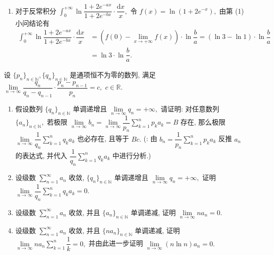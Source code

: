 \begin{solution}
\begin{enumerate}
\item 对于反常积分 $\displaystyle \int_0^{+\infty} \ln \dfrac{1+2e^{-ax}}{1+2e^{-bx}} \cdot \dfrac{\mathrm{d}x}{x},$ 令 $f(x) = \ln(1 + 2e^{-x}),$ 由第 (1) 小问结论有
\begin{align*}
\int_0^{+\infty} \ln \dfrac{1+2e^{-ax}}{1+2e^{-bx}} \cdot \dfrac{\mathrm{d}x}{x} & = (f(0) - \lim_{x \to +\infty} f(x)) \cdot \ln\dfrac{b}{a} = (\ln 3 - \ln 1) \cdot \ln\dfrac{b}{a} \\
& = \ln 3 \cdot \ln\dfrac{b}{a}.
\end{align*}
\end{enumerate}
\end{solution}


\begin{question}[points = 12]
设 $\{ p_n \}_{n \in \mathbb{N}}, \{ q_n \}_{n \in \mathbb{N}}$ 是通项恒不为零的数列, 满足 $\lim\limits_{n\to\infty} \dfrac{q_n}{q_n - q_{n-1}} \cdot \dfrac{p_n - p_{n-1}}{p_n} = c,$ $c \in \mathbb{R}.$
\begin{enumerate}
\item 假设数列 $\{ q_n \}_{n \in \mathbb{N}}$ 单调递增且 $\lim\limits_{n \to \infty} q_n = +\infty,$ 请证明: 对任意数列 $\{ a_n \}_{n \in \mathbb{N}},$ 若极限 $\lim\limits_{n \to \infty} b_n = \lim\limits_{n \to \infty} \dfrac{1}{p_n} \sum\limits_{k=1}^n p_ka_k = B$ 存在, 那么极限 $\lim\limits_{n \to \infty} \dfrac{1}{q_n} \sum\limits_{k=1}^n q_ka_k$ 也必存在, 且等于 $Bc.$ (: 由 $\displaystyle b_n = \dfrac{1}{p_n} \sum\limits_{k=1}^n p_ka_k$ 反推 $a_n$ 的表达式, 并代入 $\displaystyle \dfrac{1}{q_n} \sum\limits_{k=1}^n q_ka_k$ 中进行分析.)
\item 设级数 $\sum\limits_{n=1}^\infty a_n$ 收敛, $\{ q_n \}_{n \in \mathbb{N}}$ 单调递增且 $\lim\limits_{n \to \infty} q_n = +\infty,$ 证明 $\lim\limits_{n \to \infty} \dfrac{1}{q_n} \sum\limits_{k=1}^n q_ka_k = 0.$
\item 设级数 $\sum\limits_{n=1}^\infty a_n$ 收敛, 并且 $\{ a_n \}_{n \in \mathbb{N}}$ 单调递减, 证明 $\lim\limits_{n \to \infty} na_n = 0.$
\item 设级数 $\sum\limits_{n=1}^\infty a_n$ 收敛, 并且 $\{ na_n \}_{n \in \mathbb{N}}$ 单调递减, 证明 $\lim\limits_{n \to \infty} na_n \sum\limits_{k=1}^n \dfrac{1}{k} = 0,$ 并由此进一步证明 $\lim\limits_{n \to \infty} (n\ln n)a_n = 0.$
\end{enumerate}

\end{question}

